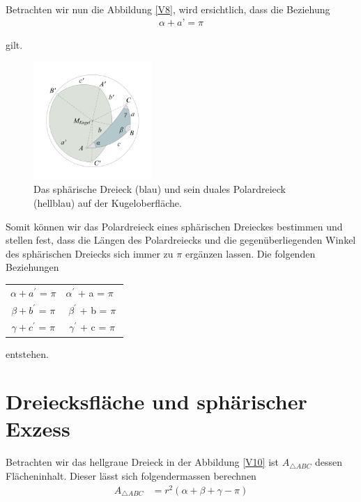 \begin{refsection}
Betrachten wir nun die Abbildung \eqref{V8}, wird ersichtlich, dass die Beziehung
\begin{align*}
{\alpha + a’} = {\pi}
\end{align*}

gilt. 

\begin{figure}[htbp]
\centering
\includegraphics[width=0.4\textwidth]{kugel/Polardreieck.jpg}
\caption{Das sphärische Dreieck (blau) und sein duales Polardreieck (hellblau) auf der Kugeloberfläche.}
\end{figure}

Somit können wir das Polardreieck eines sphärischen Dreieckes bestimmen und stellen fest, dass die Längen des Polardreiecks und die gegenüberliegenden Winkel des sphärischen Dreiecks sich immer zu $\pi$ ergänzen lassen. Die folgenden Beziehungen

\begin{center}
\renewcommand{\arraystretch}{1.5}
\begin{tabular}{cc}
$\alpha + a^{\prime}$ = $\pi$ & $\alpha^{\prime}$ + a = $\pi$ \\
$\beta + b^{\prime}$ = $\pi$ & $\beta^{\prime}$ + b = $\pi$ \\
$\gamma + c^{\prime}$ = $\pi$ & $\gamma^{\prime}$ + c = $\pi$
\end{tabular}
\end{center} 

entstehen.


\section{Dreiecksfläche und sphärischer Exzess} \label{Flaeche}
Betrachten wir das hellgraue Dreieck in der Abbildung \eqref{V10} ist $A_{\triangle{ABC}}$ dessen Flächeninhalt. Dieser lässt sich folgendermassen berechnen
\begin{align*}
A_{\triangle{ABC}} &= r^{2}(\alpha + \beta + \gamma - \pi)
\end{align*}


\end{refsection}
